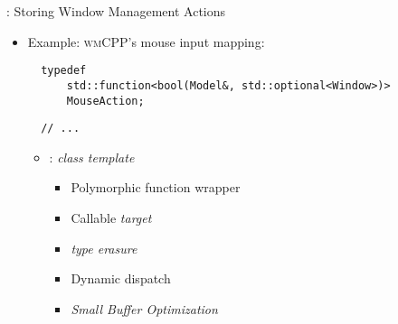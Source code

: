 \begin{frame}[fragile]{\underline{\cpp}: Storing Window Management Actions \hfill {\footnotesize \currentname}}


    \begin{itemize}

        \item Example: \textsc{wmCPP}'s mouse input mapping:\\[3pt]
\begin{verbatim}
  typedef
      std::function<bool(Model&, std::optional<Window>)>
      MouseAction;
\end{verbatim}
\begin{verbatim}
  // ...
\end{verbatim}

    \vspace*{5pt}\begin{itemize}

        \item {}: \textit{class template}
            \begin{itemize}
                \item Polymorphic function wrapper
                \item Callable \textit{target}
                \item \cpp \textit{type erasure}
                \item Dynamic dispatch
                \item \textit{Small Buffer Optimization}
            \end{itemize}

    \end{itemize}

    \end{itemize}

    \vfill

\end{frame}

